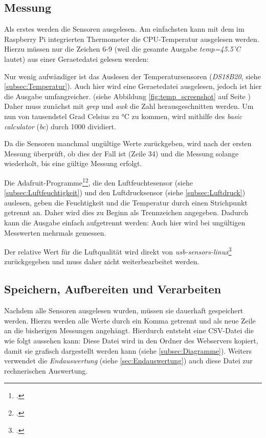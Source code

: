 
\subsection{Messung}
\label{subsec:main.sh/messung}

Als erstes werden die Sensoren ausgelesen. Am einfachsten kann mit dem im Raspberry Pi integrierten Thermometer die \gls{CPU}-Temperatur ausgelesen werden. Hierzu müssen nur die Zeichen 6-9 (weil die gesamte Ausgabe \emph{temp=45.5'C} lautet) aus einer \gls{Geraetedatei} gelesen werden:

Nur wenig aufwändiger ist das Auslesen der Temperatursensoren (\emph{DS18B20}, siehe \ref{subsec:Temperatur}). 
Auch hier wird eine \gls{Geraetedatei} ausgelesen, jedoch ist hier die Ausgabe umfangreicher. (siehe Abbildung \ref{fig:temp_screenshot} auf Seite \pageref{fig:temp_screenshot})
Daher muss zunächst mit \emph{grep} und \emph{awk} die Zahl herausgeschnitten werden. Um nun von tausendstel Grad Celsius zu \si{\degreeCelsius} zu kommen, wird  mithilfe des \emph{basic calculator} (\emph{bc}) durch 1000 dividiert.

Da die Sensoren manchmal ungültige Werte zurückgeben, wird nach der ersten Messung überprüft, ob dies der Fall ist (Zeile 34) und die Messung solange wiederholt, bis eine gültige Messung erfolgt.

Die Adafruit-Programme\footcite{DHT}\footcite{bmp058_adafruit}, die den Luftfeuchtesensor (siehe \ref{subsec:Luftfeuchtigkeit}) und den Luftdrucksensor (siehe \ref{subsec:Luftdruck}) auslesen, geben die Feuchtigkeit und die Temperatur durch einen Strichpunkt getrennt an. Daher wird dies zu Beginn als Trennzeichen angegeben. 
Dadurch kann die Ausgabe einfach aufgetrennt werden:
Auch hier wird bei ungültigen Messwerten mehrmals gemessen.

Der relative Wert für die Luftqualität wird direkt von \emph{usb-sensors-linux}\footcite{usb-sensors-linux} zurückgegeben und muss daher nicht weiterbearbeitet werden.

\subsection{Speichern, Aufbereiten und Verarbeiten}

Nachdem alle Sensoren ausgelesen wurden, müssen sie dauerhaft gespeichert werden. Hierzu werden alle Werte durch ein Komma getrennt und als neue Zeile an die bisherigen Messungen angehängt.
Hierdurch entsteht eine \gls{CSV}-Datei die wie folgt aussehen kann:
Diese Datei wird in den Ordner des Webservers kopiert, damit sie grafisch dargestellt werden kann (siehe \ref{subsec:Diagramme}). Weiters verwendet die \textit{Endauswertung} (siehe \ref{sec:Endauswertung}) auch diese Datei zur rechnerischen Auswertung.

